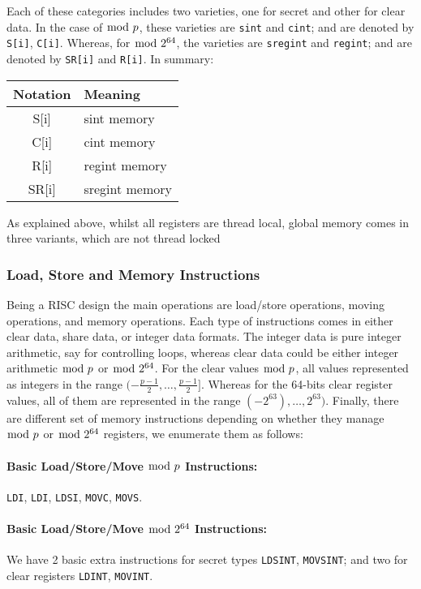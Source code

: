 Each of these categories includes two varieties, one for secret and other for clear data.
In the case of $\bmod \; p$, these varieties are \verb+sint+ and \verb+cint+; and are denoted by \verb+S[i]+, \verb+C[i]+. Whereas, for $\bmod \; 2^{64}$, the varieties are \verb+sregint+ and
\verb+regint+; and are denoted by \verb+SR[i]+ and \verb+R[i]+.
In summary:
\begin{center}
\begin{tabular}{|c|l|}
\hline
Notation & Meaning \\
\hline
    S[i]  & sint memory \\
    C[i]  & cint memory \\
    R[i]  & regint memory \\
    SR[i] & sregint memory \\
\hline
\end{tabular}
\end{center}
As explained above, whilst all registers are thread local,
global memory comes in three variants, which are not thread locked

\subsubsection{Load, Store and Memory Instructions}
Being a RISC design the main operations are load/store
operations, moving operations, and memory operations.
Each type of instructions comes in either clear data,
share data, or integer data formats.
The integer data is pure integer arithmetic, say
for controlling loops, whereas clear data could be either integer
arithmetic $\bmod \; p$ or $\bmod \; 2^{64}$.
For the clear values  $\bmod \; p$, all values represented as integers
in the range $(-\frac{p-1}{2}, \dots, \frac{p-1}{2}]$.
Whereas for the 64-bits clear register values, all of them are represented
in the range $(-2^{63}), \dots, 2^{63})$.
Finally, there are different set of memory instructions depending on whether they manage $\bmod \; p$ or $\bmod \; 2^{64}$ registers, we enumerate them as follows:

\paragraph{Basic Load/Store/Move  $\bmod \; p$ Instructions:}
\verb+LDI+,
\verb+LDI+,
\verb+LDSI+,
\verb+MOVC+,
\verb+MOVS+.


\paragraph{Basic Load/Store/Move $\bmod \; 2^{64}$ Instructions:}
We have 2 basic extra instructions for secret types \verb+LDSINT+,
\verb+MOVSINT+; and two for clear registers \verb+LDINT+, \verb+MOVINT+.



